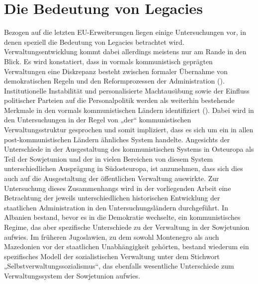 \section{Die Bedeutung von Legacies}
Bezogen auf die letzten EU-Erweiterungen liegen einige Untersuchungen vor, in denen speziell die Bedeutung von Legacies betrachtet wird. Verwaltungsentwicklung kommt dabei allerdings meistens nur am Rande in den Blick. Es wird konstatiert, dass in vormals kommunistisch geprägten Verwaltungen eine Diskrepanz besteht zwischen formaler Übernahme von demokratischen Regeln und den Reformprozessen der Administration (\cite{dimgoe, meyersah06}). Institutionelle Instabilität und personalisierte Machtausübung sowie der Einfluss politischer Parteien auf die Personalpolitik werden als weiterhin bestehende Merkmale in den vormals kommunistischen Ländern identifiziert (\cite{goewoll, meyersah08a}). Dabei wird in den Untersuchungen in der Regel von „der“ kommunistischen Verwaltungsstruktur gesprochen und somit impliziert, dass es sich um ein in allen post-kommunistischen Ländern ähnliches System handelte. Angesichts der Unterschiede in der Ausgestaltung des kommunistischen Systems in Osteuropa als Teil der Sowjetunion und der in vielen Bereichen von diesem System unterschiedlichen Ausprägung in Südosteuropa, ist anzunehmen, dass sich dies auch auf die Ausgestaltung der öffentlichen Verwaltung auswirkte. Zur Untersuchung dieses Zusammenhangs wird in der vorliegenden Arbeit eine Betrachtung der jeweils unterschiedlichen historischen Entwicklung der staatlichen Administration in den Untersuchungsländern durchgeführt. In Albanien bestand, bevor es in die Demokratie wechselte, ein kommunistisches Regime, das aber spezifische Unterschiede zu der Verwaltung in der Sowjetunion aufwies. Im früheren Jugoslawien, zu dem sowohl Montenegro als auch Mazedonien vor der staatlichen Unabhängigkeit gehörten, bestand wiederum ein spezifisches Modell der sozialistischen Verwaltung unter dem Stichwort „Selbstverwaltungssozialismus“, das ebenfalls wesentliche Unterschiede zum Verwaltungssystem der Sowjetunion aufwies.\par

